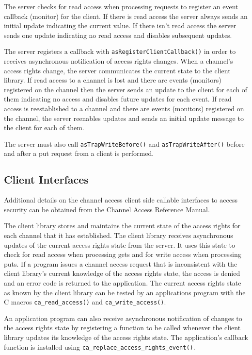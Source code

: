 The server checks for read access when processing requests to register an event callback (monitor) for the client.
If there is read access the server always sends an initial update indicating the current value.
If there isn't read access the server sends one update indicating no read access and disables subsequent updates.

The server  registers a callback with \verb|asRegisterClientCallback()| in order to receives asynchronous notification of access rights changes.
When a channel's access rights change, the server communicates the current state to the client library.
If read access to a channel is lost and there are events (monitors) registered on the channel then the server sends an update to the client for each of them indicating no access and disables future updates for each event.
If read access is reestablished to a channel and there are events (monitors) registered on the channel, the server reenables updates and sends an initial update message to the client for each of them.

The server must also call \verb|asTrapWriteBefore()| and \verb|asTrapWriteAfter()| before and after a put request from a client is performed.

\subsection{Client Interfaces}

Additional details on the channel access client side callable interfaces to access security can be obtained from the Channel Access Reference Manual.

The client library stores and maintains the current state of the access rights for each channel that it has established.
The client library receives asynchronous updates of the current access rights state from the server.
It uses this state to check for read access when processing gets and for write access when processing puts.
If a program issues a channel access request that is inconsistent with the client library's current knowledge of the access rights state, the access is denied and an error code is returned to the application.
The current access rights state as known by the client library can be tested by an applications program with the C macros \verb|ca_read_access()| and \verb|ca_write_access()|.

An application program can also receive asynchronous notification of changes to the access rights state by registering a function to be called whenever the client library updates its knowledge of the access rights state.
The application's callback function is installed using \verb|ca_replace_access_rights_event()|.

